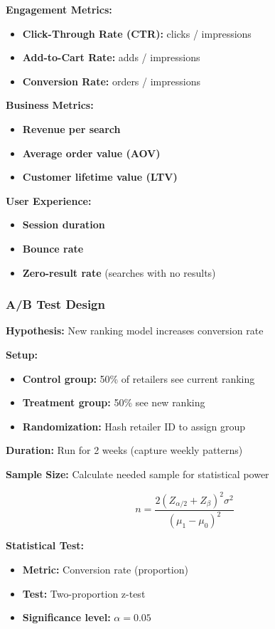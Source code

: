 \documentclass[11pt,letterpaper]{article}
\begin{document}
\textbf{Engagement Metrics:}
\begin{itemize}
    \item \textbf{Click-Through Rate (CTR):} clicks / impressions
    \item \textbf{Add-to-Cart Rate:} adds / impressions
    \item \textbf{Conversion Rate:} orders / impressions
\end{itemize}

\textbf{Business Metrics:}
\begin{itemize}
    \item \textbf{Revenue per search}
    \item \textbf{Average order value (AOV)}
    \item \textbf{Customer lifetime value (LTV)}
\end{itemize}

\textbf{User Experience:}
\begin{itemize}
    \item \textbf{Session duration}
    \item \textbf{Bounce rate}
    \item \textbf{Zero-result rate} (searches with no results)
\end{itemize}

\subsubsection{A/B Test Design}

\textbf{Hypothesis:} New ranking model increases conversion rate

\textbf{Setup:}
\begin{itemize}
    \item \textbf{Control group:} 50\% of retailers see current ranking
    \item \textbf{Treatment group:} 50\% see new ranking
    \item \textbf{Randomization:} Hash retailer ID to assign group
\end{itemize}

\textbf{Duration:} Run for 2 weeks (capture weekly patterns)

\textbf{Sample Size:} Calculate needed sample for statistical power

\begin{equation}
n = \frac{2(Z_{\alpha/2} + Z_\beta)^2 \sigma^2}{(\mu_1 - \mu_0)^2}
\end{equation}

\textbf{Statistical Test:}
\begin{itemize}
    \item \textbf{Metric:} Conversion rate (proportion)
    \item \textbf{Test:} Two-proportion z-test
    \item \textbf{Significance level:} $\alpha = 0.05$
\end{itemize}
\end{document}
